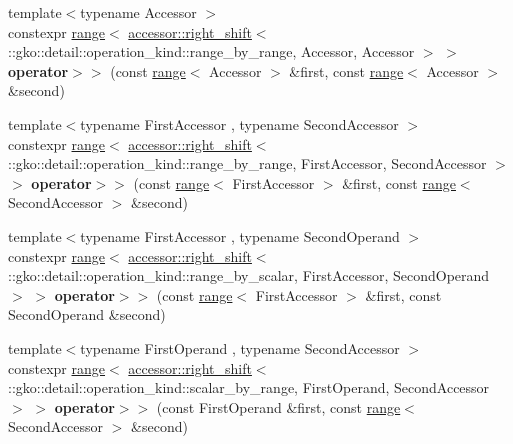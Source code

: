\begin{DoxyCompactItemize}
\item 
\mbox{\label{namespacegko_a787e41cf20d8dbf332b38f9e6bd014c8}} 
{\footnotesize template$<$typename Accessor $>$ }\\constexpr \hyperlink{classgko_1_1range}{range}$<$ \hyperlink{structgko_1_1accessor_1_1right__shift}{accessor\+::right\+\_\+shift}$<$ \+::gko\+::detail\+::operation\+\_\+kind\+::range\+\_\+by\+\_\+range, Accessor, Accessor $>$ $>$ {\bfseries operator$>$$>$} (const \hyperlink{classgko_1_1range}{range}$<$ Accessor $>$ \&first, const \hyperlink{classgko_1_1range}{range}$<$ Accessor $>$ \&second)
\item 
\mbox{\label{namespacegko_a44870f0181208f0e356c0510ef136f0a}} 
{\footnotesize template$<$typename First\+Accessor , typename Second\+Accessor $>$ }\\constexpr \hyperlink{classgko_1_1range}{range}$<$ \hyperlink{structgko_1_1accessor_1_1right__shift}{accessor\+::right\+\_\+shift}$<$ \+::gko\+::detail\+::operation\+\_\+kind\+::range\+\_\+by\+\_\+range, First\+Accessor, Second\+Accessor $>$ $>$ {\bfseries operator$>$$>$} (const \hyperlink{classgko_1_1range}{range}$<$ First\+Accessor $>$ \&first, const \hyperlink{classgko_1_1range}{range}$<$ Second\+Accessor $>$ \&second)
\item 
\mbox{\label{namespacegko_a0467ed5f04ab215c0c5639f0a4f880b5}} 
{\footnotesize template$<$typename First\+Accessor , typename Second\+Operand $>$ }\\constexpr \hyperlink{classgko_1_1range}{range}$<$ \hyperlink{structgko_1_1accessor_1_1right__shift}{accessor\+::right\+\_\+shift}$<$ \+::gko\+::detail\+::operation\+\_\+kind\+::range\+\_\+by\+\_\+scalar, First\+Accessor, Second\+Operand $>$ $>$ {\bfseries operator$>$$>$} (const \hyperlink{classgko_1_1range}{range}$<$ First\+Accessor $>$ \&first, const Second\+Operand \&second)
\item 
\mbox{\label{namespacegko_a7fb6c9447f2f6620551a3c6900f290fd}} 
{\footnotesize template$<$typename First\+Operand , typename Second\+Accessor $>$ }\\constexpr \hyperlink{classgko_1_1range}{range}$<$ \hyperlink{structgko_1_1accessor_1_1right__shift}{accessor\+::right\+\_\+shift}$<$ \+::gko\+::detail\+::operation\+\_\+kind\+::scalar\+\_\+by\+\_\+range, First\+Operand, Second\+Accessor $>$ $>$ {\bfseries operator$>$$>$} (const First\+Operand \&first, const \hyperlink{classgko_1_1range}{range}$<$ Second\+Accessor $>$ \&second)

\end{DoxyCompactItemize}
